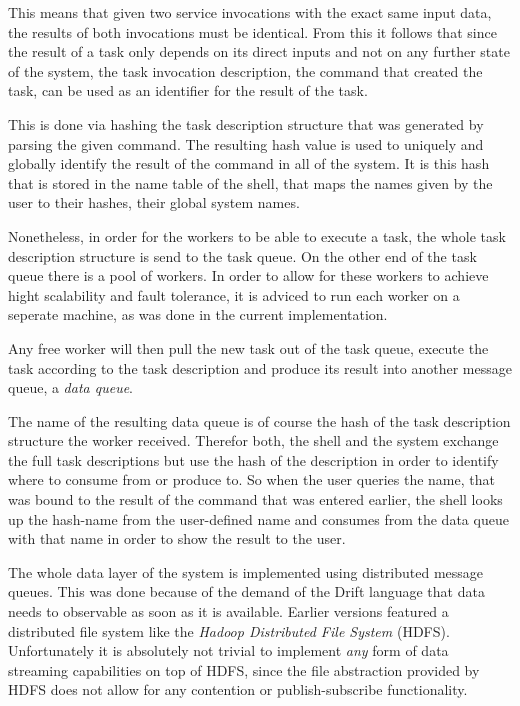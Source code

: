 This means that given two service invocations with the exact same
input data, the results of both invocations must be identical.
From this it follows that since the result of a task only depends
on its direct inputs and not on any further state of the system,
the task invocation description, the command that created the
task, can be used as an identifier for the result of the task.

This is done via hashing the task description structure that was
generated by parsing the given command. The resulting hash value
is used to uniquely and globally identify the result of the command
in all of the system. It is this hash that is stored in the name
table of the shell, that maps the names given by the user to
their hashes, their global system names.
\newline

Nonetheless, in order for the workers to be able to execute a
task, the whole task description structure is send to the task
queue. On the other end of the task queue there is a pool of
workers. In order to allow for these workers to achieve hight
scalability and fault tolerance, it is adviced to run each worker
on a seperate machine, as was done in the current implementation.

Any free worker will then pull the new task out of the task queue,
execute the task according to the task description and produce its
result into another message queue, a \textit{data queue}.

The name of the resulting data queue is of course the hash of the
task description structure the worker received. Therefor both,
the shell and the system exchange the full task descriptions
but use the hash of the description in order to identify where
to consume from or produce to. So when the user queries the name,
that was bound to the result of the command that was entered
earlier, the shell looks up the hash-name from the user-defined
name and consumes from the data queue with that name in order to show
the result to the user.
\newline

The whole data layer of the system is implemented using distributed
message queues. This was done because of the demand of the Drift
language that data needs to observable as soon as it is available.
Earlier versions featured a distributed file system like the
\textit{Hadoop Distributed File System} (HDFS). Unfortunately it
is absolutely not trivial to implement \textit{any} form of
data streaming capabilities on top of HDFS, since the file
abstraction provided by HDFS does not allow for any contention
or publish-subscribe functionality.

